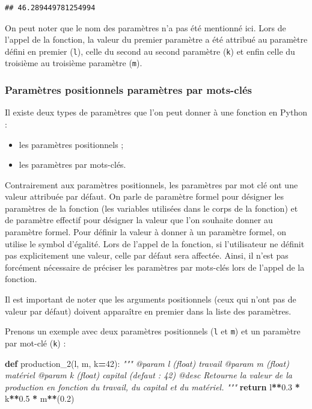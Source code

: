 \documentclass[12pt,]{book}
\newenvironment{Shaded}{\begin{snugshade}}{\end{snugshade}}
\newcommand{\KeywordTok}[1]{\textcolor[rgb]{0.13,0.29,0.53}{\textbf{#1}}}
\newcommand{\DecValTok}[1]{\textcolor[rgb]{0.00,0.00,0.81}{#1}}
\newcommand{\FloatTok}[1]{\textcolor[rgb]{0.00,0.00,0.81}{#1}}
\newcommand{\CommentTok}[1]{\textcolor[rgb]{0.56,0.35,0.01}{\textit{#1}}}
\newcommand{\ControlFlowTok}[1]{\textcolor[rgb]{0.13,0.29,0.53}{\textbf{#1}}}
\newcommand{\OperatorTok}[1]{\textcolor[rgb]{0.81,0.36,0.00}{\textbf{#1}}}
\newcommand{\NormalTok}[1]{#1}
\providecommand{\tightlist}{%
  \setlength{\itemsep}{0pt}\setlength{\parskip}{0pt}}
\numberwithin{equation}{section}
\numberwithin{countremarque}{section}
\begin{document}
\begin{lstlisting}
## 46.289449781254994
\end{lstlisting}

On peut noter que le nom des paramètres n'a pas été mentionné ici. Lors
de l'appel de la fonction, la valeur du premier paramètre a été attribué
au paramètre défini en premier (\texttt{l}), celle du second au second
paramètre (\texttt{k}) et enfin celle du troisième au troisième
paramètre (\texttt{m}).

\subsubsection{Paramètres positionnels paramètres par
mots-clés}\label{parametres-positionnels-parametres-par-mots-cles}

Il existe deux types de paramètres que l'on peut donner à une fonction
en Python :

\begin{itemize}
\tightlist
\item
  les paramètres positionnels ;
\item
  les paramètres par mots-clés.
\end{itemize}

Contrairement aux paramètres positionnels, les paramètres par mot clé
ont une valeur attribuée par défaut. On parle de paramètre formel pour
désigner les paramètres de la fonction (les variables utilisées dans le
corps de la fonction) et de paramètre effectif pour désigner la valeur
que l'on souhaite donner au paramètre formel. Pour définir la valeur à
donner à un paramètre formel, on utilise le symbol d'égalité. Lors de
l'appel de la fonction, si l'utilisateur ne définit pas explicitement
une valeur, celle par défaut sera affectée. Ainsi, il n'est pas
forcément nécessaire de préciser les paramètres par mots-clés lors de
l'appel de la fonction.

Il est important de noter que les arguments positionnels (ceux qui n'ont
pas de valeur par défaut) doivent apparaître en premier dans la liste
des paramètres.

Prenons un exemple avec deux paramètres positionnels (\texttt{l} et
\texttt{m}) et un paramètre par mot-clé (\texttt{k}) :

\begin{Shaded}
\begin{Highlighting}[]
\KeywordTok{def}\NormalTok{ production_2(l, m, k}\OperatorTok{=}\DecValTok{42}\NormalTok{):}
  \CommentTok{"""}
\CommentTok{  @param l (float) travail}
\CommentTok{  @param m (float) matériel}
\CommentTok{  @param k (float) capital (defaut : 42)}
\CommentTok{  @desc Retourne la valeur de la production en fonction}
\CommentTok{    du travail, du capital et du matériel.}
\CommentTok{  """}
  \ControlFlowTok{return}\NormalTok{ l}\OperatorTok{**}\FloatTok{0.3} \OperatorTok{*}\NormalTok{ k}\OperatorTok{**}\FloatTok{0.5} \OperatorTok{*}\NormalTok{ m}\OperatorTok{**}\NormalTok{(}\FloatTok{0.2}\NormalTok{)}
\end{Highlighting}
\end{Shaded}
\end{document}
